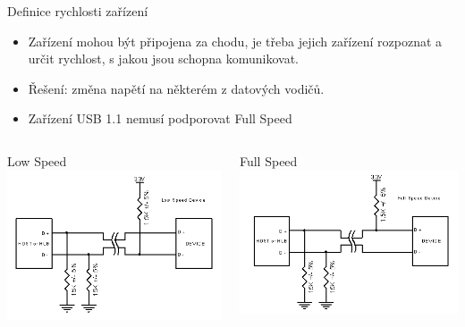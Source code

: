 \documentclass[aspectratio=43]{beamer}
\begin{document}
\begin{frame}{Definice rychlosti zařízení}
	\begin{itemize}
		\item Zařízení mohou být připojena za chodu, je třeba jejich zařízení rozpoznat a určit rychlost, s jakou jsou schopna komunikovat.
		\item Řešení: změna napětí na některém z datových vodičů.
		\item Zařízení USB 1.1 nemusí podporovat Full Speed
	\end{itemize}
	
	\begin{columns}
		\begin{center}
			Low Speed
			\includegraphics[width=1\linewidth]{extrahovane_obrazky/img_3_page7_4.png}
		\end{center}
		\begin{center}
			Full Speed
			\includegraphics[width=1\linewidth]{extrahovane_obrazky/img_3_page7_5.png}
		\end{center}
	\end{columns}
	
\end{frame}
\end{document}
